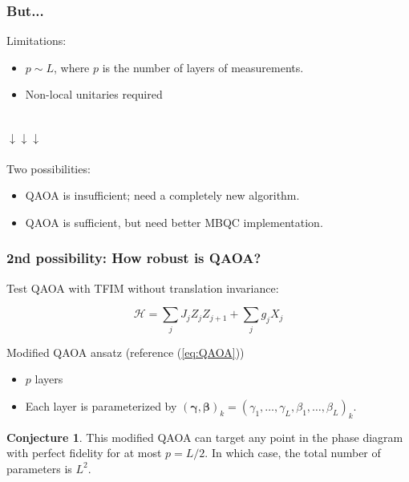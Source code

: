 \documentclass{beamer}
\theoremstyle{definition}
\newtheorem{conjecture}{Conjecture}[section]
\begin{document}


\begin{frame}
\frametitle{But...}
Limitations: 
\begin{itemize}
	\item $p \sim L$, where $p$ is the number of layers of measurements. 
	\item Non-local unitaries required
\end{itemize}




$\,$\\
$\downarrow\downarrow\downarrow$\\

$\,$\\

Two possibilities:
\begin{itemize}
	\item QAOA is insufficient; need a completely new algorithm.
	\item QAOA is sufficient, but need better MBQC implementation. %
\end{itemize} 



\end{frame}






\begin{frame}
\frametitle{2nd possibility: How robust is QAOA?}

Test QAOA with TFIM without translation invariance:

\begin{equation}\label{eq:QAOAmod}
\mathcal{H} = \sum_{j}J_j Z_j Z_{j+1} + \sum_j g_j  X_j
\end{equation}


Modified QAOA ansatz (reference (\ref{eq:QAOA}))
\begin{itemize}
	\item $p$ layers
	\item Each layer is parameterized by $(\bm\gamma,\bm\beta)_k = (\gamma_{1},\dots,\gamma_{L},\beta_{1},\dots,\beta_{L} )_k$.
\end{itemize}


\begin{conjecture}
	This modified QAOA can target any point in the phase diagram with perfect fidelity for at most $p = L/2$. In which case, the total number of parameters is $L^2$.  
\end{conjecture}




\end{frame}
\end{document}
